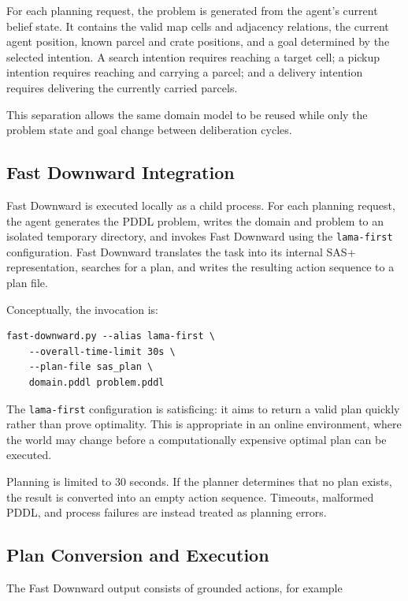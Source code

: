 \documentclass[a4paper]{article}
\begin{document}
For each planning request, the problem is generated from the agent's current
belief state. It contains the valid map cells and adjacency relations, the
current agent position, known parcel and crate positions, and a goal determined
by the selected intention. A search intention requires reaching a target cell;
a pickup intention requires reaching and carrying a parcel; and a delivery
intention requires delivering the currently carried parcels.

This separation allows the same domain model to be reused while only the
problem state and goal change between deliberation cycles.

\subsection{Fast Downward Integration}

Fast Downward is executed locally as a child process. For each planning
request, the agent generates the PDDL problem, writes the domain and problem to
an isolated temporary directory, and invokes Fast Downward using the
\texttt{lama-first} configuration. Fast Downward translates the task into its
internal SAS+ representation, searches for a plan, and writes the resulting
action sequence to a plan file.

Conceptually, the invocation is:

\begin{verbatim}
fast-downward.py --alias lama-first \
    --overall-time-limit 30s \
    --plan-file sas_plan \
    domain.pddl problem.pddl
\end{verbatim}

The \texttt{lama-first} configuration is satisficing: it aims to return a valid
plan quickly rather than prove optimality. This is appropriate in an online
environment, where the world may change before a computationally expensive
optimal plan can be executed.

Planning is limited to 30 seconds. If the planner determines that no plan
exists, the result is converted into an empty action sequence. Timeouts,
malformed PDDL, and process failures are instead treated as planning errors.

\subsection{Plan Conversion and Execution}

The Fast Downward output consists of grounded actions, for example
\end{document}
